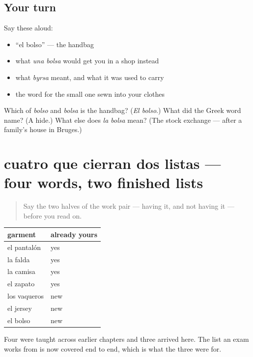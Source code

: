 \subsection*{Your turn}
Say these aloud:

\begin{itemize}
\raggedright
  \item \textquotedblleft{}el bolso\textquotedblright{} — the handbag
  \item what \emph{una bolsa} would get you in a shop instead
  \item what \emph{byrsa} meant, and what it was used to carry
  \item the word for the small one sewn into your clothes
\end{itemize}

\begin{tcolorbox}[breakable,colback=teal!4,colframe=teal!35!black,title={Before you move on}]
Which of \emph{bolso} and \emph{bolsa} is the handbag? (\emph{El bolso}.) What did the Greek word name? (A hide.) What else does \emph{la bolsa} mean? (The stock exchange — after a family's house in Bruges.)
\end{tcolorbox}
\section[cuatro que cierran dos listas]{cuatro que cierran dos listas — four words, two finished lists}

\label{lesson:ES-C430-repaso-piezas}



\begin{quote}
Say the two halves of the work pair — having it, and not having it — before you read on.
\end{quote}

\begin{grammarlens}[title={Grammar Lens: the wardrobe, complete}]
\noindent
\begin{tabularx}{\linewidth}{@{}>{\raggedright\arraybackslash}X>{\raggedright\arraybackslash}X@{}}
\toprule
\textbf{garment} & \textbf{already yours} \\
\midrule
el pantalón & yes \\
la falda & yes \\
la camisa & yes \\
el zapato & yes \\
los vaqueros & new \\
el jersey & new \\
el bolso & new \\
\bottomrule
\end{tabularx}

Four were taught across earlier chapters and three arrived here. The list an exam works from is now covered end to end, which is what the three were for.
\end{grammarlens}

